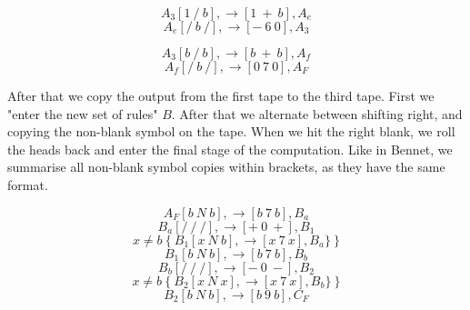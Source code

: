 \documentclass[12pt]{report}
\begin{document}
      \begin{equation}
        A_3 [1\ /\ b], \rightarrow  [1\ +\ b], A_e  \label{eq:rule_8_1}
      \end{equation}
      \begin{equation}
        A_e [/\ b\ /], \rightarrow  [-\ 6\ 0], A_3  \label{eq:rule_8_2}
      \end{equation}

      \begin{equation}
        A_3 [b\ /\ b], \rightarrow  [b\ +\ b], A_f  \label{eq:rule_9_1}
      \end{equation}
      \begin{equation}
        A_f [/\ b\ /], \rightarrow  [0\ 7\ 0], A_F  \label{eq:rule_9_2}
      \end{equation}

    After that we copy the output from the first tape to the third tape. First we "enter the new set of rules" $B$. After that we alternate between shifting right, and copying the non-blank symbol on the tape. When we hit the right blank, we roll the heads back and enter the final stage of the computation. Like in Bennet, we summarise all non-blank symbol copies within brackets, as they have the same format.

      \begin{equation}
        A_F [b\ N\ b], \rightarrow  [b\ 7\ b], B_a  \label{eq:rule_B_S}
      \end{equation}
      \begin{equation}
        B_a [/\ /\ /], \rightarrow  [+\ 0\ +], B_1  \label{eq:rule_B_A}
      \end{equation}
      \begin{equation} 
      x \neq b \ \{ \
        B_1 [x\ N\ b], \rightarrow  [x\ 7\ x], B_a  \} \label{eq:rule_B_1}
     \ \}
      \end{equation}
      \begin{equation}
        B_1 [b\ N\ b], \rightarrow  [b\ 7\ b], B_b  \label{eq:rule_B_1_2}
      \end{equation}
      \begin{equation}
        B_b [/\ /\ /], \rightarrow  [-\ 0\ -], B_2  \label{eq:rule_B_B}
      \end{equation}
      \begin{equation} 
      x \neq b \ \{ \
        B_2 [x\ N\ x], \rightarrow  [x\ 7\ x], B_b  \} \label{eq:rule_B_2}
     \ \}
      \end{equation}
      \begin{equation}
        B_2 [b\ N\ b], \rightarrow  [b\ 9\ b], C_F  \label{eq:rule_B_2_2}
      \end{equation}
      
\end{document}
